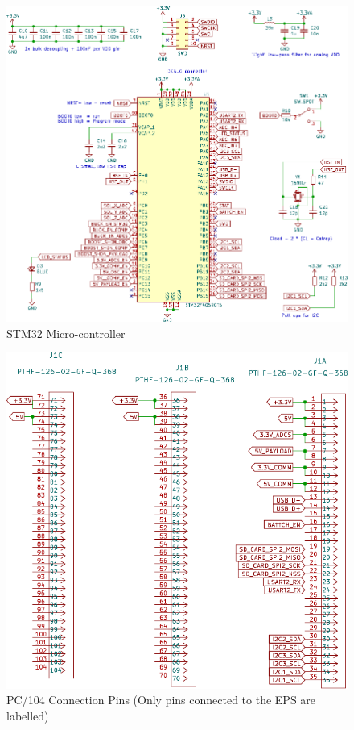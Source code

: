    \begin{figure}[H]
 	\centering
 	\includegraphics[width=0.99\columnwidth]{FrontMatter/pcb-STM32F405board.pdf}
 	\caption{\centering STM32 Micro-controller}
 	\label{fig:uC 4lr}
 \end{figure}


   \begin{figure}[H]
 	\centering
 	\includegraphics[width=0.99\columnwidth]{FrontMatter/pcb.pdf}
 	\caption{\centering PC/104 Connection Pins (Only pins connected to the EPS are labelled)}
 	\label{fig:pc104 4lr}
 \end{figure}
 
